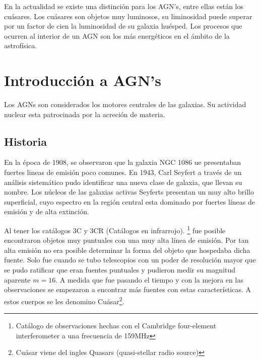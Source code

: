 En la actualidad se existe una distinción para los AGN's, entre ellas están los cuásares. Los cuásares son objetos muy luminosos, su liminosidad puede superar por un factor de cien la luminosidad de su galaxia huésped. Los procesos que ocurren al interior de un AGN son los más energéticos en el ámbito de la astrofísica. 


\section{Introducción a AGN's}
\label{sec:Introduction_AGN's}

Los AGNs son considerados los motores centrales de las galaxias. Su  actividad nuclear esta patrocinada por la acreción de materia. 

	\subsection{Historia}
	\label{subsec:History}
	
En la época de 1908, se observaron que la galaxia NGC 1086 ue presentaban fuertes lineas de emisión poco comunes. En 1943, Carl Seyfert a través de un análisis sistemático pudo identificar una nueva clase de galaxia, que llevan su nombre. Los núcleos de  las galaxias activas Seyferts presentan un muy alto brillo superficial, cuyo espectro en la región central esta dominado por fuertes líneas de emisión y de alta extinción.  

Al tener los catálogos 3C y 3CR (Catálogos en infrarrojo). \footnote{Catálogo de observaciones hechas con el Cambridge four-element interferometer a una frecuencia de 159MHz} fue posible encontraron objetos muy puntuales con una muy alta línea de emisión. Por tan alta emisión no era posible determinar la forma del objeto que hospedaba dicha fuente. Solo fue cuando se tubo telescopios con un poder de resolución mayor que se pudo ratificar que eran fuentes puntuales y pudieron medir su magnitud aparente $m=16$. A medida que fue pasando el tiempo y con la mejora en las observaciones se empezaron a encontrar más fuentes con estas características. A estos cuerpos se les denomino  Cuásar\footnote{Cuásar viene del ingles Quasars (quasi-stellar radio source)}.

